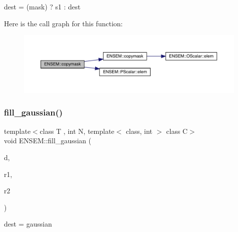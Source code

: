 dest = (mask) ? s1 \+: dest 

Here is the call graph for this function\+:\nopagebreak
\begin{figure}[H]
\begin{center}
\leavevmode
\includegraphics[width=350pt]{df/d0a/group__primmatrix_ga6bebd0377eb8253b3d4ba1586d1ecdad_cgraph}
\end{center}
\end{figure}
\mbox{\label{group__primmatrix_gaad23aac5e121c759d15b6153996bdf9e}} 
\subsubsection{\texorpdfstring{fill\_gaussian()}{fill\_gaussian()}}
{\footnotesize\ttfamily template$<$class T , int N, template$<$ class, int $>$ class C$>$ \\
void E\+N\+S\+E\+M\+::fill\+\_\+gaussian (\begin{DoxyParamCaption}\item[{\mbox{\hyperlink{classENSEM_1_1PMatrix}{P\+Matrix}}$<$ T, \mbox{\hyperlink{operator__name__util_8cc_a7722c8ecbb62d99aee7ce68b1752f337}{N}}, C $>$ \&}]{d,  }\item[{\mbox{\hyperlink{classENSEM_1_1PMatrix}{P\+Matrix}}$<$ T, \mbox{\hyperlink{operator__name__util_8cc_a7722c8ecbb62d99aee7ce68b1752f337}{N}}, C $>$ \&}]{r1,  }\item[{\mbox{\hyperlink{classENSEM_1_1PMatrix}{P\+Matrix}}$<$ T, \mbox{\hyperlink{operator__name__util_8cc_a7722c8ecbb62d99aee7ce68b1752f337}{N}}, C $>$ \&}]{r2 }\end{DoxyParamCaption})\hspace{0.3cm}{\ttfamily [inline]}}



dest = gaussian 


